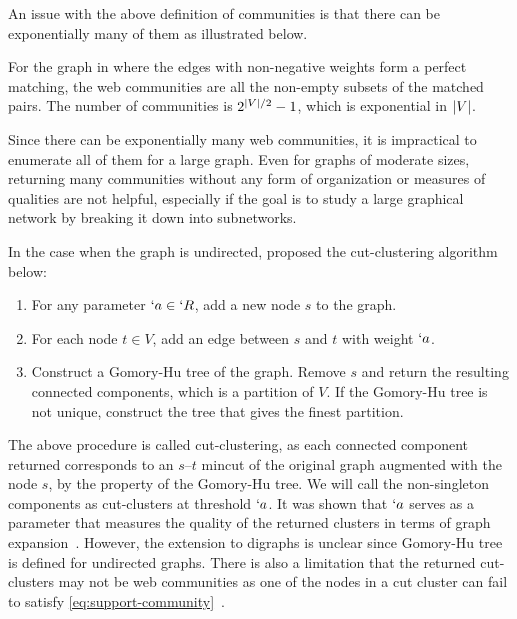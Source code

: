 An issue with the above definition of communities is that there can be exponentially many of them as illustrated below.

\begin{example}
  \label{eg:too-many-communities}
  For the graph in  where the edges with non-negative weights form a perfect matching, the web communities are all the non-empty subsets of the matched pairs. The number of communities is $2^{\lvert V\rvert/2}-1$, which is exponential in $\lvert V\rvert$.
\end{example}

Since there can be exponentially many web communities, it is impractical to enumerate all of them for a large graph. Even for graphs of moderate sizes, returning many communities without any form of organization or measures of qualities are not helpful, especially if the goal is to study a large graphical network by breaking it down into subnetworks. 

In the case when the graph is undirected, \cite{flake:cut-clustering} proposed the cut-clustering algorithm below: 
\begin{enumerate}
\item For any parameter $`a\in `R$, add a new node $s$ to the graph.
\item For each node $t\in V$, add an edge between $s$ and $t$ with weight $`a$.
\item Construct a Gomory-Hu tree of the graph. Remove $s$ and return the resulting connected components, which is a partition of $V$. If the Gomory-Hu tree is not unique, construct the tree that gives the finest partition.
\end{enumerate}
The above procedure is called cut-clustering, as each connected component returned corresponds to an $s$--$t$ mincut of the original graph augmented with the node $s$, by the property of the Gomory-Hu tree. We will call the non-singleton components as cut-clusters at threshold $`a$. It was shown that $`a$ serves as a parameter that measures the quality of the returned clusters in terms of graph expansion~\cite[(3.3)]{flake:cut-clustering}. However, the extension to digraphs is unclear since Gomory-Hu tree is defined for undirected graphs. There is also a limitation that the returned cut-clusters may not be web communities as one of the nodes in a cut cluster can fail to satisfy \eqref{eq:support-community}~\cite[Lemma~3.1]{flake:cut-clustering}.